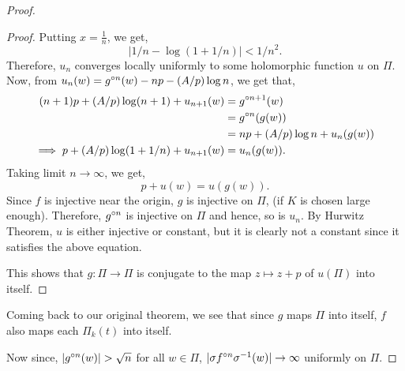 \begin{proof}
\begin{proof}
Putting \( x=\frac{1}{n} \), we get, \[
	|1 /n-\log (1+ 1 /n)|<1 /n^2
.\] 
Therefore, \( u_n\) converges locally uniformly to some holomorphic function \( u \) on \( \Pi \).\\
Now, from \( u_n(w)=\gog[n](w)-np-(A /p)\log n \), we get that, 
\begin{align*}
	(n+1)p+(A /p)\log (n+1)+u_{n+1}(w)&=\gog[n+1](w)\\
									  &=\gog[n](g(w))\\
									  &=np+(A /p)\log n+u_n(g(w))\\
	\implies p+(A /p)\log (1+1 /n)+u_{n+1}(w)&=u_n(g(w))
.\end{align*}
Taking limit \( n\to \infty \), we get, \[
	p+u(w)=u(g(w))
.\] 
Since \( f \) is injective near the origin, \( g \) is injective on \( \Pi \),
(if \( K \) is chosen large enough). Therefore, \( \gog[n] \) is injective on \( \Pi \)
and hence, so is \( u_n \). By Hurwitz Theorem, \( u \) is either injective or constant, but it
is clearly not a constant since it satisfies the above equation.

This shows that \( g:\Pi\to \Pi \) is conjugate to the map \( z\mapsto z+p \) of \( u(\Pi) \) into
itself.
\end{proof}

Coming back to our original theorem, we see that since \( g \) maps \( \Pi \) into itself, \( f\)
also maps each \( \Pi_k(t) \) into itself.

Now since, \( |\gog[n](w)|>\sqrt{n}  \) for all \( w\in\Pi \), 
\( |\sigma \fof[n]\sigma^{-1}(w)|\to \infty \)
uniformly on \( \Pi \).

\end{proof}
